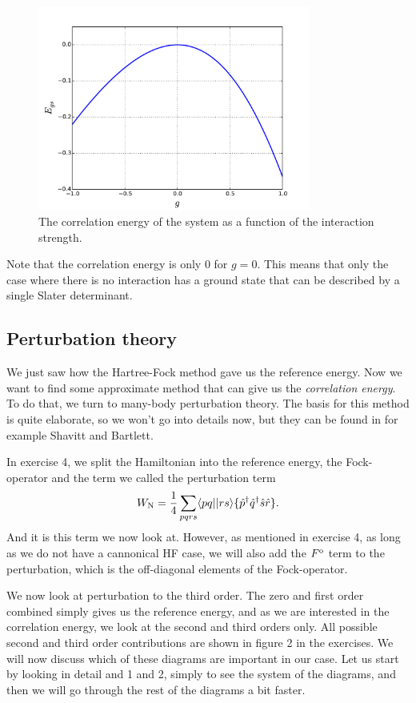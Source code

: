 \documentclass[a4paper, 11pt, notitlepage, english]{article}
\newcommand{\brakket}[2]{\langle #1 || #2 \rangle}
\newcommand{\op}[1]{\hat{#1}}
\begin{document}
\begin{figure}[htbp]
\centering 
\includegraphics[width=0.8\textwidth]{proj2_correlation}
\caption{The correlation energy of the system as a function of the interaction strength. \label{fig:correlation_energy}}
\end{figure}

Note that the correlation energy is only $0$ for $g=0$. This means that only the case where there is no interaction has a ground state that can be described by a single Slater determinant.

\subsection*{Perturbation theory}

We just saw how the Hartree-Fock method gave us the reference energy. Now we want to find some approximate method that can give us the \emph{correlation energy}. To do that, we turn to many-body perturbation theory. The basis for this method is quite elaborate, so we won't go into details now, but they can be found in for example Shavitt and Bartlett.

In exercise 4, we split the Hamiltonian into the reference energy, the Fock-operator and the term we called the perturbation term
$$W_{\rm N} = \frac{1}{4}\sum_{pqrs} \brakket{pq}{rs} \{\op{p}^\dagger\op{q}^\dagger\op{s}\op{r}\}.$$
And it is this term we now look at. However, as mentioned in exercise 4, as long as we do not have a cannonical HF case, we will also add the $F^{\rm o}$ term to the perturbation, which is the off-diagonal elements of the Fock-operator.

We now look at perturbation to the third order. The zero and first order combined simply gives us the reference energy, and as we are interested in the correlation energy, we look at the second and third orders only. All possible second and third order contributions are shown in figure 2 in the exercises. We will now discuss which of these diagrams are important in our case. Let us start by looking in detail and 1 and 2, simply to see the system of the diagrams, and then we will go through the rest of the diagrams a bit faster.
\end{document}
